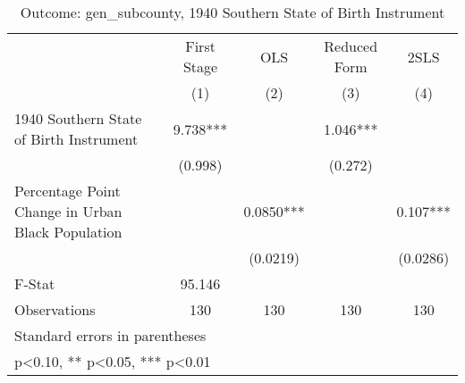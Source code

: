 \begin{table}[htbp]\centering
\def\sym#1{\ifmmode^{#1}\else\(^{#1}\)\fi}
\caption{Outcome: gen\_subcounty, 1940 Southern State of Birth Instrument}
\begin{tabular}{l*{4}{c}}
\toprule
                    & First Stage   &         OLS   &Reduced Form   &        2SLS   \\
                    &\multicolumn{1}{c}{(1)}   &\multicolumn{1}{c}{(2)}   &\multicolumn{1}{c}{(3)}   &\multicolumn{1}{c}{(4)}   \\
\midrule
1940 Southern State of Birth Instrument&       9.738***&               &       1.046***&               \\
                    &     (0.998)   &               &     (0.272)   &               \\
\addlinespace
Percentage Point Change in Urban Black Population&               &      0.0850***&               &       0.107***\\
                    &               &    (0.0219)   &               &    (0.0286)   \\
\midrule
F-Stat              &      95.146   &               &               &               \\
Observations        &         130   &         130   &         130   &         130   \\
\bottomrule
\multicolumn{5}{l}{\footnotesize Standard errors in parentheses}\\
\multicolumn{5}{l}{\footnotesize * p<0.10, ** p<0.05, *** p<0.01}\\
\end{tabular}
\end{table}
